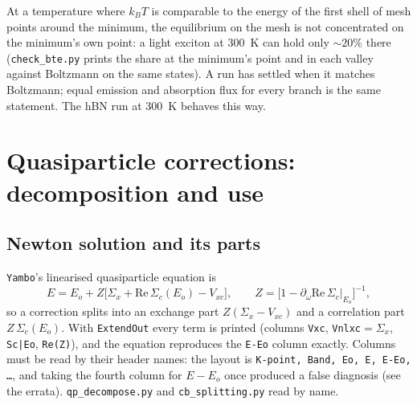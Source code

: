 At a temperature where $k_BT$ is comparable to the energy of the first shell of
mesh points around the minimum, the equilibrium on the mesh is not concentrated
on the minimum's own point: a light exciton at 300~K can hold only
$\sim20\%$ there (\texttt{check\_bte.py} prints the share at the minimum's point and
in each valley against Boltzmann on the same states). A run has settled when it
matches Boltzmann; equal emission and absorption flux for every branch is the
same statement. The hBN run at 300~K behaves this way.

\section{Quasiparticle corrections: decomposition and use}
\label{sec:gw}

\subsection{Newton solution and its parts}
\texttt{Yambo}'s linearised quasiparticle equation is
\begin{equation}
E=E_o+Z\bigl[\Sigma_x+\mathrm{Re}\,\Sigma_c(E_o)-V_{xc}\bigr],\qquad
Z=\bigl[1-\partial_\omega\mathrm{Re}\,\Sigma_c|_{E_o}\bigr]^{-1},
\end{equation}
so a correction splits into an exchange part $Z(\Sigma_x-V_{xc})$ and a
correlation part $Z\,\Sigma_c(E_o)$. With \texttt{ExtendOut} every term is
printed (columns \texttt{Vxc}, \texttt{Vnlxc}$=\Sigma_x$, \texttt{Sc|Eo},
\texttt{Re(Z)}), and the equation reproduces the \texttt{E-Eo} column exactly.
Columns must be read by their header names: the layout is
\texttt{K-point, Band, Eo, E, E-Eo, \ldots}, and taking the fourth column for
$E-E_o$ once produced a false diagnosis (see the errata).
\texttt{qp\_decompose.py} and \texttt{cb\_splitting.py} read by name.

